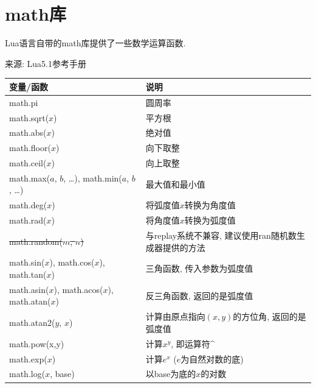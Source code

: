 \section{math库}

Lua语言自带的math库提供了一些数学运算函数.

来源: Lua5.1参考手册

\begin{center}
  \begin{xltabular}{\textwidth}{XX}
    \toprule
    变量/函数 & 说明 \\
    \midrule

    math.pi &
    圆周率 \\

    math.sqrt($x$) &
    平方根 \\

    math.abs($x$) &
    绝对值 \\

    math.floor($x$) &
    向下取整 \\

    math.ceil($x$) &
    向上取整 \\

    math.max($a$, $b$, \dots), math.min($a$, $b$, \dots) &
    最大值和最小值 \\

    math.deg($x$) &
    将弧度值$x$转换为角度值 \\

    math.rad($x$) &
    将角度值$x$转换为弧度值 \\

    \st{math.random($m$, $n$)} &
    与replay系统不兼容, 建议使用ran随机数生成器提供的方法 \\

    math.sin($x$), math.cos($x$), math.tan($x$) &
    三角函数, 传入参数为弧度值 \\

    math.asin($x$), math.acos($x$), math.atan($x$) &
    反三角函数, 返回的是弧度值 \\

    math.atan2($y$, $x$) &
    计算由原点指向$(x,y)$的方位角, 返回的是弧度值 \\

    math.pow(x,y) &
    计算$x^y$, 即运算符\textasciicircum \\

    math.exp($x$) &
    计算$e^x$ ($e$为自然对数的底) \\

    math.log($x$, base) &
    以base为底的$x$的对数 \\


\end{xltabular}
\end{center}
